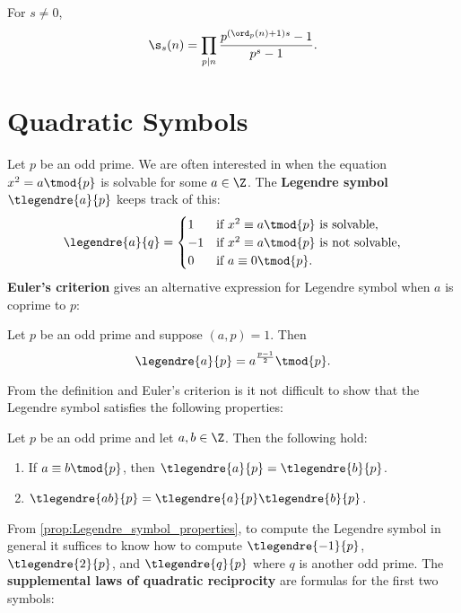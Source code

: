     \begin{proposition}\label{prop:generalized_sum_of_divisors_as_product}
      For $s \neq 0$,
      \[
        \s_{s}(n) = \prod_{p \mid n}\frac{p^{(\ord_{p}(n)+1)s}-1}{p^{s}-1}.
      \]
    \end{proposition}
  \section{Quadratic Symbols}
    Let $p$ be an odd prime. We are often interested in when the equation $x^{2} = a \tmod{p}$ is solvable for some $a \in \Z$. The \textbf{Legendre symbol} $\tlegendre{a}{p}$ keeps track of this:
    \[
      \legendre{a}{q} = \begin{cases} 1 & \text{if $x^{2} \equiv a \tmod{p}$ is solvable}, \\ -1 & \text{if $x^{2} \equiv a \tmod{p}$ is not solvable}, \\ 0 & \text{if $a \equiv 0 \tmod{p}$}. \end{cases}
    \]
    \textbf{Euler's criterion} gives an alternative expression for Legendre symbol when $a$ is coprime to $p$:
    \begin{proposition}
      Let $p$ be an odd prime and suppose $(a,p) = 1$. Then
      \[
        \legendre{a}{p} = a^{\frac{p-1}{2}} \tmod{p}.
      \]
    \end{proposition}
    From the definition and Euler's criterion is it not difficult to show that the Legendre symbol satisfies the following properties:
    \begin{proposition}\label{prop:Legendre_symbol_properties}
      Let $p$ be an odd prime and let $a,b \in \Z$. Then the following hold:
      \begin{enumerate}[label=(\roman*)]
        \item If $a \equiv b \tmod{p}$, then $\tlegendre{a}{p} = \tlegendre{b}{p}$.
        \item $\tlegendre{ab}{p} = \tlegendre{a}{p}\tlegendre{b}{p}$.
      \end{enumerate}
    \end{proposition}
    From \cref{prop:Legendre_symbol_properties}, to compute the Legendre symbol in general it suffices to know how to compute $\tlegendre{-1}{p}$, $\tlegendre{2}{p}$, and $\tlegendre{q}{p}$ where $q$ is another odd prime. The \textbf{supplemental laws of quadratic reciprocity} are formulas for the first two symbols:
